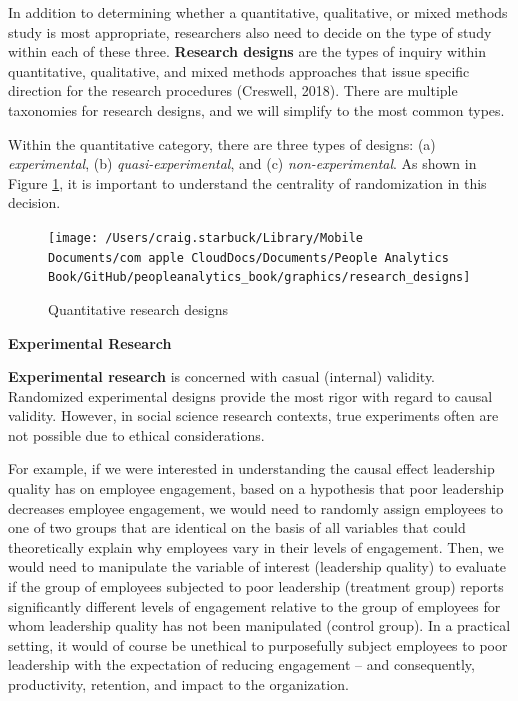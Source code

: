 \documentclass[
]{book}
\begin{document}
In addition to determining whether a quantitative, qualitative, or mixed methods study is most appropriate, researchers also need to decide on the type of study within each of these three. \textbf{Research designs} are the types of inquiry within quantitative, qualitative, and mixed methods approaches that issue specific direction for the research procedures (Creswell, 2018). There are multiple taxonomies for research designs, and we will simplify to the most common types.

Within the quantitative category, there are three types of designs: (a) \emph{experimental}, (b) \emph{quasi-experimental}, and (c) \emph{non-experimental}. As shown in Figure \ref{fig:res-designs}, it is important to understand the centrality of randomization in this decision.

\begin{figure}

{\centering \texttt{[image: /Users/craig.starbuck/Library/Mobile Documents/com~apple~CloudDocs/Documents/People Analytics Book/GitHub/peopleanalytics\_book/graphics/research\_designs]} 

}

\caption{Quantitative research designs}\label{fig:res-designs}
\end{figure}

\textbf{Experimental Research}

\textbf{Experimental research} is concerned with casual (internal) validity. Randomized experimental designs provide the most rigor with regard to causal validity. However, in social science research contexts, true experiments often are not possible due to ethical considerations.

For example, if we were interested in understanding the causal effect leadership quality has on employee engagement, based on a hypothesis that poor leadership decreases employee engagement, we would need to randomly assign employees to one of two groups that are identical on the basis of all variables that could theoretically explain why employees vary in their levels of engagement. Then, we would need to manipulate the variable of interest (leadership quality) to evaluate if the group of employees subjected to poor leadership (treatment group) reports significantly different levels of engagement relative to the group of employees for whom leadership quality has not been manipulated (control group). In a practical setting, it would of course be unethical to purposefully subject employees to poor leadership with the expectation of reducing engagement -- and consequently, productivity, retention, and impact to the organization.
\end{document}
